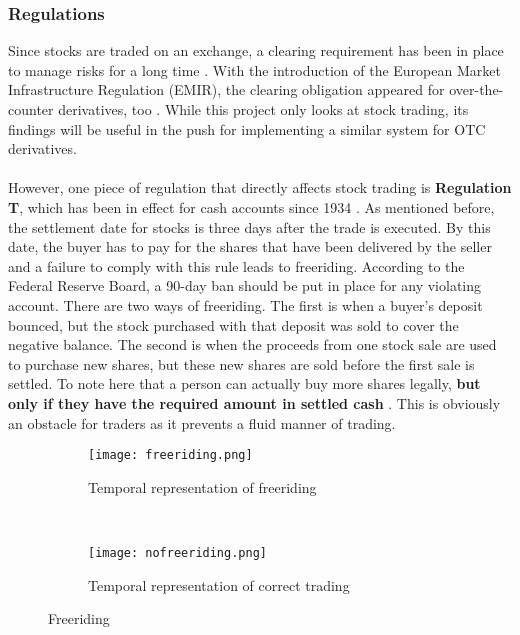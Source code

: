 \documentclass[12pt,twoside]{article}
\begin{document}
\subsubsection{Regulations}
\label{sub:Regulations}
Since stocks are traded on an exchange, a clearing requirement has been in place to manage risks for a long time \cite{etdclearing}. With the introduction of the European Market Infrastructure Regulation (EMIR), the clearing obligation appeared for over-the-counter derivatives, too \cite{emir}. While this project only looks at stock trading, its findings will be useful in the push for implementing a similar system for OTC derivatives.
\\ \\
However, one piece of regulation that directly affects stock trading is \textbf{Regulation T}, which has been in effect for cash accounts since 1934 \cite{settledate2}. As mentioned before, the settlement date for stocks is three days after the trade is executed. By this date, the buyer has to pay for the shares that have been delivered by the seller and a failure to comply with this rule leads to freeriding. According to the Federal Reserve Board, a 90-day ban should be put in place for any violating account. There are two ways of freeriding. The first is when a buyer's deposit bounced, but the stock purchased with that deposit was sold to cover the negative balance. The second is when the proceeds from one stock sale are used to purchase new shares, but these new shares are sold before the first sale is settled. To note here that a person can actually buy more shares legally, \textbf{but only if they have the required amount in settled cash} \cite{settledate}. This is obviously an obstacle for traders as it prevents a fluid manner of trading.
\\
\begin{figure}[!htb]
    \centering
    \begin{subfigure}[b]{0.8\textwidth}
    	\centering
        \texttt{[image: freeriding.png]}
        \caption{Temporal representation of freeriding}
        \label{fig:fr1}
    \end{subfigure}
    ~
    \begin{subfigure}[b]{0.8\textwidth}
    	\centering
        \texttt{[image: nofreeriding.png]}
        \caption{Temporal representation of correct trading}
        \label{fig:fr2}
    \end{subfigure}
    \caption{Freeriding}
    \label{fig:freeriding}
\end{figure}
\end{document}
